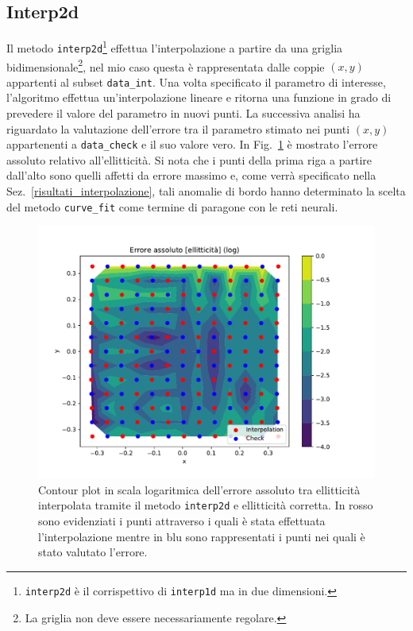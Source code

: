 \documentclass[12pt,a4paper,final]{book}
\begin{document}

\subsection{Interp2d}\label{interp2d}
Il metodo \texttt{interp2d}\footnote{\texttt{interp2d} è il corrispettivo di \texttt{interp1d} ma in due dimensioni.} effettua l'interpolazione a partire da una griglia bidimensionale\footnote{La griglia non deve essere necessariamente regolare.}, nel mio caso questa è rappresentata dalle coppie $(x,y)$ appartenti al subset \texttt{data\_int}. Una volta specificato il parametro di interesse, l'algoritmo effettua un'interpolazione lineare e ritorna una funzione in grado di prevedere il valore del parametro in nuovi punti.
La successiva analisi ha riguardato la valutazione dell'errore tra il parametro stimato nei punti $(x,y)$ appartenenti a \texttt{data\_check} e il suo valore vero. In Fig.~\ref{err_interp2d} è mostrato l'errore assoluto relativo all'ellitticità.
Si nota che i punti della prima riga a partire dall'alto sono quelli affetti da errore massimo e, come verrà specificato nella Sez.~\ref{risultati_interpolazione}, tali anomalie di bordo hanno determinato la scelta del metodo \texttt{curve\_fit} come termine di paragone con le reti neurali.
\begin{figure}[!ht]
	\centering
	\includegraphics[scale=0.6]{../figures/errore_assoluto_ell.pdf}
	\caption{Contour plot in scala logaritmica dell'errore assoluto tra ellitticità interpolata tramite il metodo \texttt{interp2d} e ellitticità corretta. In rosso sono evidenziati i punti attraverso i quali è stata effettuata l'interpolazione mentre in blu sono rappresentati i punti nei quali è stato valutato l'errore.}
	\label{err_interp2d}
\end{figure}
\end{document}
